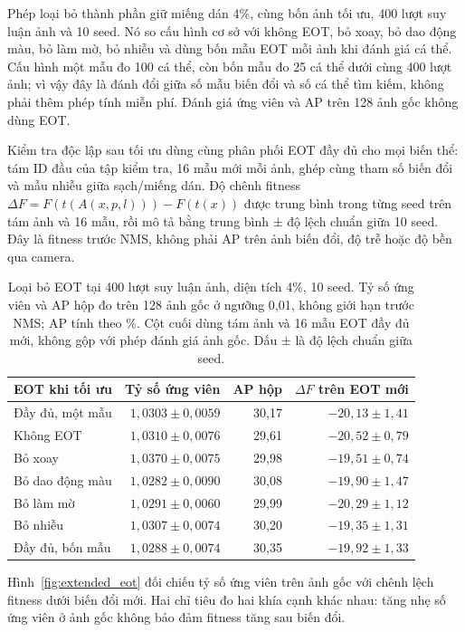 \documentclass[a4paper,fleqn]{cas-dc}
\begin{document}
Phép loại bỏ thành phần giữ miếng dán 4\%, cùng bốn ảnh tối ưu, 400 lượt suy luận ảnh và 10 seed. Nó so cấu hình cơ sở với không EOT, bỏ xoay, bỏ dao động màu, bỏ làm mờ, bỏ nhiễu và dùng bốn mẫu EOT mỗi ảnh khi đánh giá cá thể. Cấu hình một mẫu đo 100 cá thể, còn bốn mẫu đo 25 cá thể dưới cùng 400 lượt ảnh; vì vậy đây là đánh đổi giữa số mẫu biến đổi và số cá thể tìm kiếm, không phải thêm phép tính miễn phí. Đánh giá ứng viên và AP trên 128 ảnh gốc không dùng EOT.

Kiểm tra độc lập sau tối ưu dùng cùng phân phối EOT đầy đủ cho mọi biến thể: tám ID đầu của tập kiểm tra, 16 mẫu mới mỗi ảnh, ghép cùng tham số biến đổi và mẫu nhiễu giữa sạch/miếng dán. Độ chênh fitness $\Delta F=F(t(A(x,p,l)))-F(t(x))$ được trung bình trong từng seed trên tám ảnh và 16 mẫu, rồi mô tả bằng trung bình ± độ lệch chuẩn giữa 10 seed. Đây là fitness trước NMS, không phải AP trên ảnh biến đổi, độ trễ hoặc độ bền qua camera.

\begin{table}[t]
\centering
\small
\caption{Loại bỏ EOT tại 400 lượt suy luận ảnh, diện tích 4\%, 10 seed. Tỷ số ứng viên và AP hộp đo trên 128 ảnh gốc ở ngưỡng 0,01, không giới hạn trước NMS; AP tính theo \%. Cột cuối dùng tám ảnh và 16 mẫu EOT đầy đủ mới, không gộp với phép đánh giá ảnh gốc. Dấu ± là độ lệch chuẩn giữa seed.}
\begin{tabularx}{\textwidth}{Xrrr}
\toprule
EOT khi tối ưu & Tỷ số ứng viên & AP hộp & $\Delta F$ trên EOT mới \\
\midrule
Đầy đủ, một mẫu & $1{,}0303\pm0{,}0059$ & 30,17 & $-20{,}13\pm1{,}41$ \\
Không EOT & $1{,}0310\pm0{,}0076$ & 29,61 & $-20{,}52\pm0{,}79$ \\
Bỏ xoay & $1{,}0370\pm0{,}0075$ & 29,98 & $-19{,}51\pm0{,}74$ \\
Bỏ dao động màu & $1{,}0282\pm0{,}0090$ & 30,08 & $-19{,}90\pm1{,}47$ \\
Bỏ làm mờ & $1{,}0291\pm0{,}0060$ & 29,99 & $-20{,}29\pm1{,}12$ \\
Bỏ nhiễu & $1{,}0307\pm0{,}0074$ & 30,20 & $-19{,}35\pm1{,}31$ \\
Đầy đủ, bốn mẫu & $1{,}0288\pm0{,}0074$ & 30,35 & $-19{,}92\pm1{,}33$ \\
\bottomrule
\end{tabularx}
\label{tab:extended_eot}
\end{table}

Hình~\ref{fig:extended_eot} đối chiếu tỷ số ứng viên trên ảnh gốc với chênh lệch fitness dưới biến đổi mới. Hai chỉ tiêu đo hai khía cạnh khác nhau: tăng nhẹ số ứng viên ở ảnh gốc không bảo đảm fitness tăng sau biến đổi.
\end{document}

